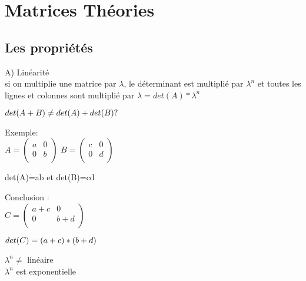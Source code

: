 
\newpage
\section{Matrices Théories}
\vspace{10mm} %

\subsection{Les propriétés}
\vspace{5mm} %

A) Linéarité \\

si on multiplie une matrice par $\lambda$, le déterminant est multiplié par $\lambda^{n}$ et toutes les lignes et colonnes sont multiplié par $\lambda=det(A)*\lambda^{n}$ \\
\vspace{5mm} %

$
det(A+B) \neq det(A)+det(B) ? \\
$

Exemple:\\

$
A =
\begin{pmatrix}
  a & 0 \\
  0 & b \\
\end{pmatrix}
$
\vspace{5mm} %
$
B =
\begin{pmatrix}
  c & 0 \\
  0 & d \\
\end{pmatrix}
$

\vspace{3mm} %
det(A)=ab et det(B)=cd\\
\vspace{5mm} %

Conclusion : \\

$
C =
\begin{pmatrix}
  a+c & 0 \\
  0 & b+d \\
\end{pmatrix}
$

\vspace{3mm} %
$
det(C)=(a+c)*(b+d) \\
$

\vspace{3mm} %
$\lambda^{n} \neq$ linéaire \\
$\lambda^{n}$ est exponentielle

